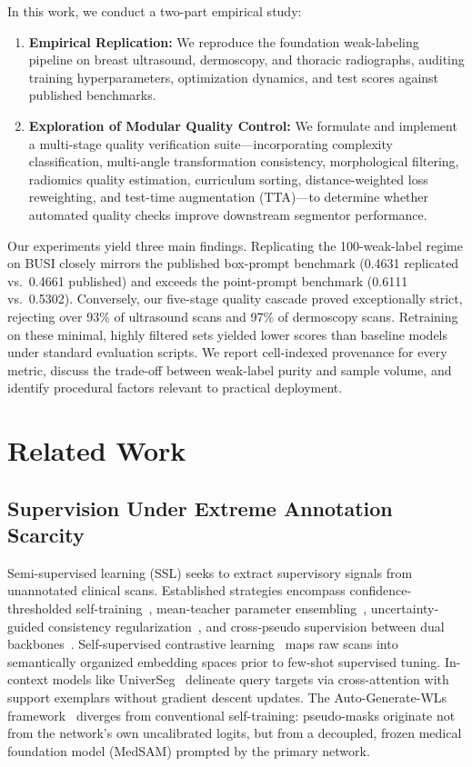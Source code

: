 \documentclass[journal,11pt,onecolumn,draftclsnofoot]{IEEEtran}
\begin{document}
In this work, we conduct a two-part empirical study:
\begin{enumerate}
    \item \textbf{Empirical Replication:} We reproduce the foundation weak-labeling pipeline on breast ultrasound, dermoscopy, and thoracic radiographs, auditing training hyperparameters, optimization dynamics, and test scores against published benchmarks.
    \item \textbf{Exploration of Modular Quality Control:} We formulate and implement a multi-stage quality verification suite---incorporating complexity classification, multi-angle transformation consistency, morphological filtering, radiomics quality estimation, curriculum sorting, distance-weighted loss reweighting, and test-time augmentation (TTA)---to determine whether automated quality checks improve downstream segmentor performance.
\end{enumerate}

Our experiments yield three main findings. Replicating the 100-weak-label regime on BUSI closely mirrors the published box-prompt benchmark (0.4631 replicated vs.\ 0.4661 published) and exceeds the point-prompt benchmark (0.6111 vs.\ 0.5302). Conversely, our five-stage quality cascade proved exceptionally strict, rejecting over 93\% of ultrasound scans and 97\% of dermoscopy scans. Retraining on these minimal, highly filtered sets yielded lower scores than baseline models under standard evaluation scripts. We report cell-indexed provenance for every metric, discuss the trade-off between weak-label purity and sample volume, and identify procedural factors relevant to practical deployment.

\section{Related Work}
\label{sec:related}

\subsection{Supervision Under Extreme Annotation Scarcity}
Semi-supervised learning (SSL) seeks to extract supervisory signals from unannotated clinical scans. Established strategies encompass confidence-thresholded self-training~\cite{lee2013}, mean-teacher parameter ensembling~\cite{tarvainen2017}, uncertainty-guided consistency regularization~\cite{yu2019}, and cross-pseudo supervision between dual backbones~\cite{chen2021cps}. Self-supervised contrastive learning~\cite{chen2020simclr,chaitanya2020} maps raw scans into semantically organized embedding spaces prior to few-shot supervised tuning. In-context models like UniverSeg~\cite{butoi2023} delineate query targets via cross-attention with support exemplars without gradient descent updates. The Auto-Generate-WLs framework~\cite{deshpande2024} diverges from conventional self-training: pseudo-masks originate not from the network's own uncalibrated logits, but from a decoupled, frozen medical foundation model (MedSAM) prompted by the primary network.
\end{document}
